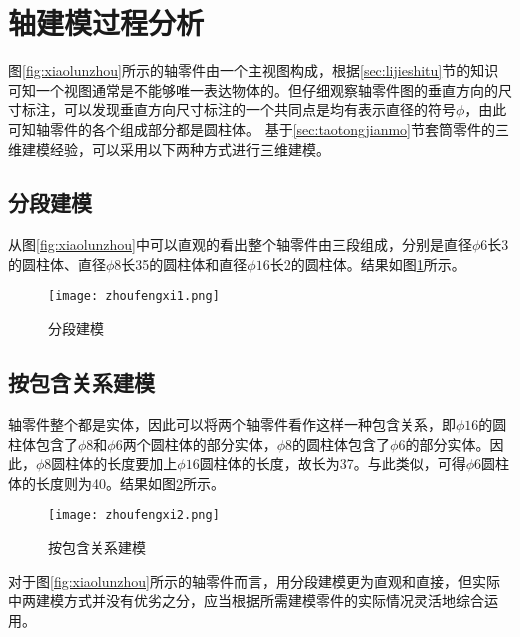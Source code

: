 \section{轴建模过程分析}
图\ref{fig:xiaolunzhou}所示的轴零件由一个主视图构成，根据\ref{sec:lijieshitu}节的知识可知一个视图通常是不能够唯一表达物体的。但仔细观察轴零件图的垂直方向的尺寸标注，可以发现垂直方向尺寸标注的一个共同点是均有表示直径的符号$\phi$，由此可知轴零件的各个组成部分都是圆柱体。 基于\ref{sec:taotongjianmo}节套筒零件的三维建模经验，可以采用以下两种方式进行三维建模。

\subsection{分段建模}
从图\ref{fig:xiaolunzhou}中可以直观的看出整个轴零件由三段组成，分别是直径$\phi 6$长3的圆柱体、直径$\phi 8$长35的圆柱体和直径$\phi 16$长2的圆柱体。结果如图\ref{fig:zhoufengxi1}所示。
\begin{figure}[htbp]
\centering
\texttt{[image: zhoufengxi1.png]}
\caption{分段建模}\label{fig:zhoufengxi1}
\end{figure}
\subsection{按包含关系建模}
轴零件整个都是实体，因此可以将两个轴零件看作这样一种包含关系，即$\phi 16$的圆柱体包含了$\phi 8$和$\phi 6$两个圆柱体的部分实体，$\phi 8$的圆柱体包含了$\phi 6$的部分实体。因此，$\phi 8$圆柱体的长度要加上$\phi 16$圆柱体的长度，故长为37。与此类似，可得$\phi 6$圆柱体的长度则为40。结果如图\ref{fig:zhoufengxi2}所示。
\begin{figure}[htbp]
\centering
\texttt{[image: zhoufengxi2.png]}
\caption{按包含关系建模}\label{fig:zhoufengxi2}
\end{figure}

对于图\ref{fig:xiaolunzhou}所示的轴零件而言，用分段建模更为直观和直接，但实际中两建模方式并没有优劣之分，应当根据所需建模零件的实际情况灵活地综合运用。
\endinput